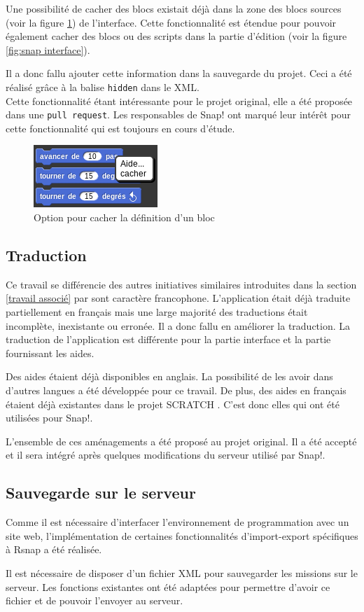Une possibilité de cacher des blocs existait déjà dans la zone des blocs sources (voir la figure \ref{fig:cacher}) de l'interface. Cette fonctionnalité est étendue pour pouvoir également cacher des blocs ou des scripts dans la partie d'édition (voir la figure \ref{fig:snap interface}).

Il a donc fallu ajouter cette information dans la sauvegarde du projet. Ceci a été réalisé grâce à la balise \texttt{hidden} dans le XML.\\


Cette fonctionnalité étant intéressante pour le projet original, elle a été proposée dans une \texttt{pull request}. Les responsables de Snap! ont marqué leur intérêt pour cette fonctionnalité qui est toujours en cours d'étude.
\begin{figure}
  \begin{center}
    \includegraphics[scale=0.5]{content/7-solution/2-snap/images/cacher}
    \caption{Option pour cacher la définition d'un bloc}
    \label{fig:cacher}
  \end{center}
\end{figure}

\subsection{Traduction}
Ce travail se différencie des autres initiatives similaires introduites dans la section \ref{travail associé} par sont caractère francophone. L'application était déjà traduite partiellement en français mais une large majorité des traductions était incomplète, inexistante ou erronée. Il a donc fallu en améliorer la traduction. La traduction de l'application est différente pour la partie interface et la partie fournissant les aides. 

Des aides étaient déjà disponibles en anglais. La possibilité de les avoir dans d'autres langues a été développée pour ce travail. De plus, des aides en français étaient déjà existantes dans le projet SCRATCH \cite{scratch-translation}. C'est donc elles qui ont été utilisées pour Snap!.

L'ensemble de ces aménagements a été proposé au projet original. Il a été accepté et il sera intégré après quelques modifications du serveur utilisé par Snap!.

\subsection{Sauvegarde sur le serveur}
Comme il est nécessaire d'interfacer l'environnement de programmation avec un site web, l'implémentation de certaines fonctionnalités d'import-export spécifiques à Rsnap a été réalisée.

Il est nécessaire de disposer d'un fichier XML pour sauvegarder les missions sur le serveur. Les fonctions existantes ont été adaptées pour permettre d'avoir ce fichier et de pouvoir l'envoyer au serveur.
